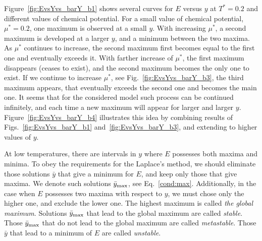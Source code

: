 \documentclass[12pt]{article}
\numberwithin{equation}{section}
\begin{document}
	Figure~\ref{fig:EvsYvs_barY_b1} shows several curves for $E$ versus $y$ at $T^*=0.2$ and different values of chemical potential. For a small value of chemical potential, $\mu^*=0.2$, one maximum is observed at a small $y$. With increasing $\mu^*$, a second maximum is developed at a larger $y$, and a minimum between the two maxima. As $\mu^*$ continues to increase, the second maximum first becomes equal to the first one and eventually exceeds it. With farther increase of $\mu^*$, the first maximum disappears (ceases to exist), and the second maximum becomes the only one to exist. If we continue to increase $\mu^*$, see Fig.~\ref{fig:EvsYvs_barY_b3}, the third maximum appears, that eventually exceeds the second one and becomes the main one. It seems that for the considered model such process can be continued infinitely, and each time a new maximum will appear for larger and larger $y$. Figure~\ref{fig:EvsYvs_barY_b4} illustrates this idea by combining results of Figs.~\ref{fig:EvsYvs_barY_b1} and~\ref{fig:EvsYvs_barY_b3}, and extending to higher values of $y$. 
	
	At low temperatures, there are intervals in $y$ where $E$ possesses both maxima and minima. To obey the requirements for the Laplace's method, we should eliminate those solutions $\bar{y}$ that give a minimum for $E$, and keep only those that give maxima. We denote such solutions $\bar{y}_{\rm max}$, see Eq.~\eqref{cond:max}. Additionally, in the case when $E$ possesses two maxima with respect to $y$, we must chose only the higher one, and exclude the lower one. The highest maximum is called {\it the global maximum}. Solutions $\bar{y}_{\rm max}$ that lead to the global maximum are called {\it stable}. Those $\bar{y}_{\rm max}$ that do not lead to the global maximum are called {\it metastable}. Those $\bar{y}$ that lead to a minimum of $E$ are called {\it unstable}.
	
\end{document}
